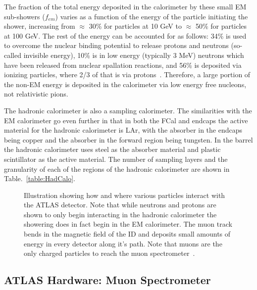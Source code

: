 The fraction of the total energy deposited in the calorimeter by these small EM sub-showers ($f_{em}$) varies as a function of the energy of the particle initiating the shower, increasing from $\approx$ 30\% for particles at 10 GeV to $\approx$ 50\% for particles at 100 GeV.  
The rest of the energy can be accounted for as follows: 34\% is used to overcome the nuclear binding potential to release protons and neutrons (so-called invisible energy), 10\% is in low energy (typically 3 MeV) neutrons which have been released from nuclear spallation reactions, and 56\% is deposited via ionizing particles, where 2/3 of that is via protons~\cite{Wigmans2008}.  
Therefore, a large portion of the non-EM energy is deposited in the calorimeter via low energy free nucleons, not relativistic pions.  

The hadronic calorimeter is also a sampling calorimeter.  
The similarities with the EM calorimeter go even further in that in both the FCal and endcaps the active material for the hadronic calorimeter is LAr, with the absorber in the endcaps being copper and the absorber in the forward region being tungsten.  
In the barrel the hadronic calorimeter uses steel as the absorber material and plastic scintillator as the active material.  
The number of sampling layers and the granularity of each of the regions of the hadronic calorimeter are shown in Table.~\ref{table:HadCalo}. 


\begin{figure}[!ht]
  \begin{center}
  \end{center}
  \caption[Grafic showing different particle interactions]
  {\small Illustration showing how and where various particles interact with the ATLAS detector.  Note that while neutrons and protons are shown to only begin interacting in the hadronic calorimeter the showering does in fact begin in the EM calorimeter.  The muon track bends in the magnetic field of the ID and deposits small amounts of energy in every detector along it's path.  Note that muons are the only charged particles to reach the muon spectrometer~\cite{JOIATLAS}.}
  \label{Fig:ATLASCrossX}
\end{figure}


\subsection{ATLAS Hardware: Muon Spectrometer}


